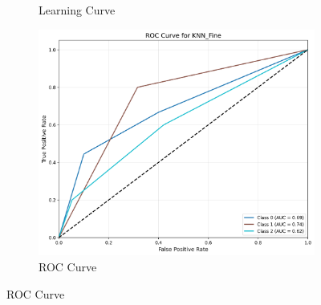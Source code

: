 \documentclass[10pt]{article}
\begin{document}
\begin{figure}[!ht]
\begin{subfigure}{0.33\textwidth}
            \caption{Learning Curve}
        \end{subfigure}
        \begin{subfigure}{0.33\textwidth}
            \centering
            \includegraphics[width=\textwidth]{code/ResultsMainAugZip/plots/Block2_KNN_Variants_Experiment_II/roc_curve_KNN_Fine.png}
            \caption{ROC Curve}
        \end{subfigure}
    \end{figure}
    
\end{document}
